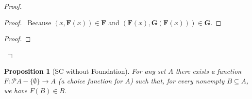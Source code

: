 \documentclass{book}
\let\qed\relax
\newtheorem{prop}[ax]{Proposition}
\theoremstyle{definition}
\begin{document}
\begin{proof}
\pf
{}
\begin{proof}
	\pf\ Because $(x, \mathbf{F}(x)) \in \mathbf{F}$ and $(\mathbf{F}(x), \mathbf{G}(\mathbf{F}(x))) \in \mathbf{G}$.
\end{proof}
\begin{proof}
\end{proof}
\qed
\end{proof}

\begin{prop}[SC without Foundation]
For any set $A$ there exists a function $F : \mathcal{P} A - \{ \emptyset \} \rightarrow A$ (a \emph{choice function} for $A$) such that, for every nonempty $B \subseteq A$, we have $F(B) \in B$.
\end{prop}
\end{document}
